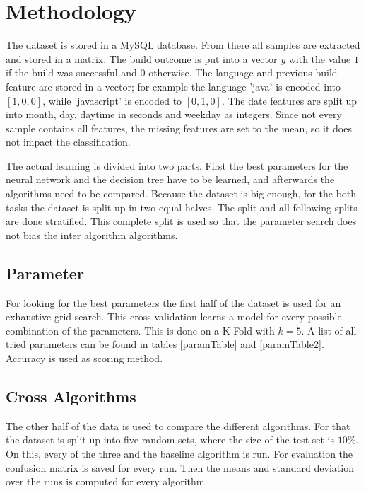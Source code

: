 \documentclass[a4paper,11pt]{article}
\begin{document}
\section{Methodology}

The dataset is stored in a MySQL database. From there all samples are extracted and stored in a matrix. The build outcome is put into a vector $y$ with the value $1$ if the build was successful and $0$ otherwise. The language and previous build feature are stored in a vector; for example the language 'java' is encoded into $[1,0,0]$, while 'javascript' is encoded to $[0,1,0]$. The date features are split up into month, day, daytime in seconds and weekday as integers. 
Since not every sample contains all features, the missing features are set to the mean, so it does not impact the classification.

The actual learning is divided into two parts. First the best parameters for the neural network and the decision tree have to be learned, and afterwards the algorithms need to be compared. Because the dataset is big enough, for the both tasks the dataset is split up in two equal halves. The split and all following splits are done stratified. This complete split is used so that the parameter search does not bias the inter algorithm algorithms. 



\subsection{Parameter}

For looking for the best parameters the first half of the dataset is used for an exhaustive grid search. This cross validation learns a model for every possible combination of the parameters. This is done on a K-Fold with $k=5$. A list of all tried parameters can be found in tables \ref{paramTable} and \ref{paramTable2}. Accuracy is used as scoring method. 




\subsection{Cross Algorithms}

The other half of the data is used to compare the different algorithms. For that the dataset is split up into five random sets, where the size of the test set is $10\%$. On this, every of the three and the baseline algorithm is run. For evaluation the confusion matrix is saved for every run. Then the means and standard deviation over the runs is computed for every algorithm.
\end{document}
